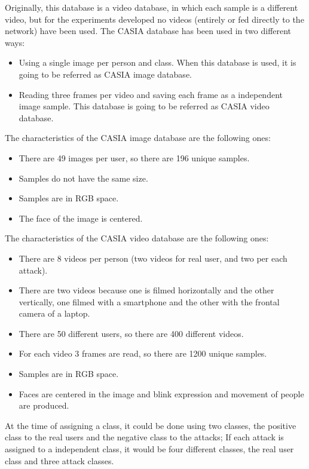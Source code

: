 Originally, this database is a video database, in which each sample is a different video, but for the experiments developed no videos (entirely or fed directly to the network) have been used. The CASIA database has been used in two different ways:
\begin{itemize} [itemsep=2pt,topsep=8pt,parsep=0pt,partopsep=20pt]
 \item Using a single image per person and class. When this database is used, it is going to be referred as CASIA image database.
 \item Reading three frames per video and saving each frame as a independent image sample. This database is going to be referred as CASIA video database.
\end{itemize}

The characteristics of the CASIA image database are the following ones:
\begin{itemize}[itemsep=2pt,topsep=8pt,parsep=0pt,partopsep=20pt]
\item There are 49 images per user, so there are 196 unique samples.
\item Samples do not have the same size.
\item Samples are in RGB space.
\item The face of the image is centered.
\end{itemize}

The characteristics of the CASIA video database are the following ones:
\begin{itemize}[itemsep=2pt,topsep=8pt,parsep=0pt,partopsep=20pt]
\item There are 8 videos per person (two videos for real user, and two per each attack).
\item There are two videos because one is filmed horizontally and the other vertically, one filmed with a smartphone and the other with the frontal camera of a laptop.
\item There are 50 different users, so there are 400 different videos.
\item For each video 3 frames are read, so there are 1200 unique samples.
\item Samples are in RGB space.
\item Faces are centered in the image and blink expression and movement of people are produced.
\end{itemize}

At the time of assigning a class, it could be done using two classes, the positive class to the real users and the negative class to the attacks; If each attack is assigned to a independent class, it would be four different classes, the real user class and three attack classes.\\

